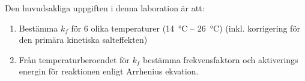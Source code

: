 Den huvudsakliga uppgiften i denna laboration är att:
\begin{enumerate}
\item Bestämma $k_f$ för 6 olika temperaturer (\SI{14}{\degreeCelsius} --
  \SI{26}{\degreeCelsius}) (inkl. korrigering för den primära kinetiska
  salteffekten) 
\item Från temperaturberoendet för $k_f$ bestämma frekvensfaktorn och
  aktiverings energin för reaktionen enligt Arrhenius ekvation.
\end{enumerate}
